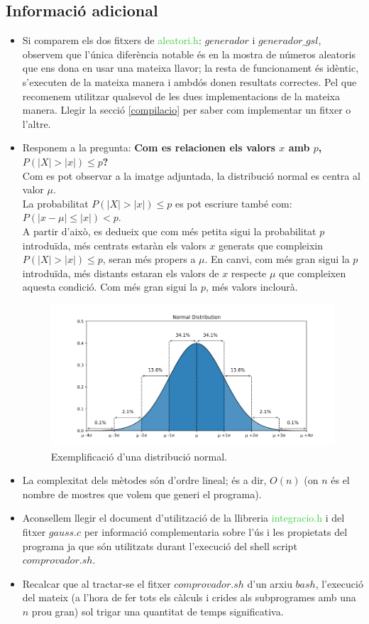 \documentclass[a4paper, 11pt]{article}
\begin{document}
\subsection{Informació adicional}
\begin{itemize}
    \item Si comparem els dos fitxers de \textcolor{LimeGreen}{aleatori.h}: $generador$ i $generador\_gsl$, observem que l'única diferència notable és en la mostra de números aleatoris que ens dona en usar una mateixa llavor; la resta de funcionament és idèntic, s'executen de la mateixa manera i ambdós donen resultats correctes. Pel que recomenem utilitzar qualsevol de les dues implementacions de la mateixa manera. Llegir la secció \textcolor{blue}{\ref{compilacio}}  per saber com implementar un fitxer o l'altre.
    \item Responem a la pregunta: \textbf{Com es relacionen els valors $x$ amb $p$, $P(|X| > |x| ) \leq p $?}\\
    Com es pot observar a la imatge adjuntada, la distribució normal es centra al valor $\mu$.\\
    La probabilitat $P(|X| > |x| ) \leq p $ es pot escriure també com: $P(|x-\mu| \leq |x| ) < p$.\\
    A partir d'això, es dedueix que com més petita sigui la probabilitat $p$ introduïda, més centrats estaràn els valors $x$ generats que compleixin $P(|X| > |x| ) \leq p $, seran més propers a $\mu$. En canvi, com més gran sigui la $p$ introduïda, més distants estaran els valors de $x$ respecte $\mu$ que compleixen aquesta condició. Com més gran sigui la $p$, més valors inclourà.
    \begin{figure}[h]
        \centering
        \includegraphics[width = 0.45 \textwidth]{normalele.png}
        \caption{Exemplificació d'una distribució normal.}
        \label{fig:my_label}
    \end{figure}

    \item La complexitat dels mètodes són d'ordre lineal; és a dir, $O(n)$ (on $n$ és el nombre de mostres que volem que generi el programa).
    \item Aconsellem llegir el document d'utilització de la llibreria \textcolor{LimeGreen}{integracio.h} i del fitxer $gauss.c$ per informació complementaria sobre l'ús i les propietats del programa ja que són utilitzats durant l'execució del shell script $comprovador.sh$.
    \item Recalcar que al tractar-se el fitxer $comprovador.sh$ d'un arxiu $bash$, l'execució del mateix (a l'hora de fer tots els càlculs i crides als subprogrames amb una $n$ prou gran) sol trigar una quantitat de temps significativa.
\end{itemize}
\end{document}
